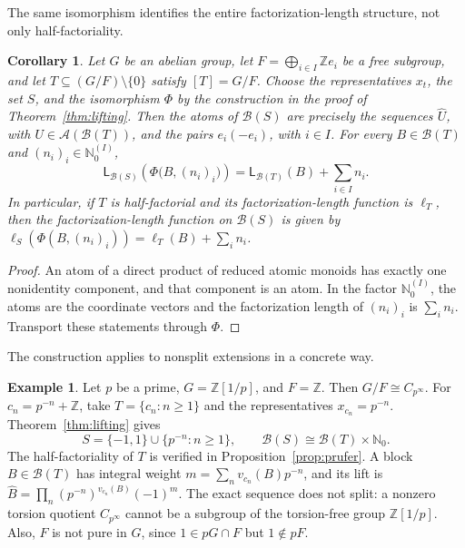 \documentclass[11pt,reqno]{amsart}
\numberwithin{equation}{section}
\newtheorem{corollary}[theorem]{Corollary}
\theoremstyle{definition}
\newtheorem{example}[theorem]{Example}
\theoremstyle{remark}
\newcommand{\Z}{\mathbb Z}
\newcommand{\Nzero}{\mathbb N_0}
\newcommand{\B}{\mathcal B}
\newcommand{\A}{\mathcal A}
\newcommand{\LL}{\mathsf L}
\begin{document}
The same isomorphism identifies the entire factorization-length
structure, not only half-factoriality.

\begin{corollary}\label{cor:lengths}
Let $G$ be an abelian group, let $F=\bigoplus_{i\in I}\Z e_i$
be a free subgroup, and let $T\subseteq(G/F)\setminus\{0\}$
satisfy $[T]=G/F$. Choose the representatives $x_t$, the set $S$,
and the isomorphism $\Phi$ by the construction in the proof of
Theorem~\ref{thm:lifting}. Then the atoms of $\B(S)$ are precisely the sequences $\widehat U$, with
$U\in\A(\B(T))$, and the pairs $e_i(-e_i)$, with $i\in I$.
For every $B\in\B(T)$ and $(n_i)_i\in\Nzero^{(I)}$,
\begin{equation}\label{eq:lengths}
 \LL_{\B(S)}\!\left(\Phi\bigl(B,(n_i)_i\bigr)\right)
 =\LL_{\B(T)}(B)+\sum_{i\in I}n_i.
\end{equation}
In particular, if $T$ is half-factorial and its factorization-length
function is $\ell_T$, then the factorization-length function on $\B(S)$
is given by
$\ell_S(\Phi(B,(n_i)_i))=\ell_T(B)+\sum_i n_i$.
\end{corollary}

\begin{proof}
An atom of a direct product of reduced atomic monoids has exactly
one nonidentity component, and that component is an atom. In the
factor $\Nzero^{(I)}$, the atoms are the coordinate vectors and
the factorization length of $(n_i)_i$ is $\sum_i n_i$. Transport
these statements through $\Phi$.
\end{proof}

The construction applies to nonsplit extensions in a concrete way.

\begin{example}\label{ex:localization}
Let $p$ be a prime, $G=\Z[1/p]$, and $F=\Z$. Then
$G/F\cong C_{p^\infty}$. For $c_n=p^{-n}+\Z$, take
$T=\{c_n:n\ge1\}$ and the representatives $x_{c_n}=p^{-n}$.
Theorem~\ref{thm:lifting} gives
\[
 S=\{-1,1\}\cup\{p^{-n}:n\ge1\},\qquad
 \B(S)\cong\B(T)\times\Nzero.
\]
The half-factoriality of $T$ is verified in
Proposition~\ref{prop:prufer}. A block $B\in\B(T)$ has integral
weight $m=\sum_n v_{c_n}(B)p^{-n}$, and its lift is
$\widehat B=\prod_n(p^{-n})^{v_{c_n}(B)}(-1)^m$.
The exact sequence does not split: a nonzero torsion quotient
$C_{p^\infty}$ cannot be a subgroup of the torsion-free group
$\Z[1/p]$. Also, $F$ is not pure in $G$, since $1\in pG\cap F$
but $1\notin pF$.
\end{example}
\end{document}
